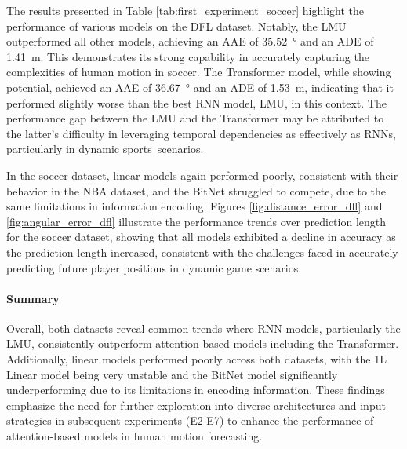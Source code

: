 The results presented in Table \ref{tab:first_experiment_soccer} highlight the performance of various models on the DFL dataset. Notably, the LMU outperformed all other models, achieving an AAE of \SI{35.52}{\degree} and an ADE of \SI{1.41}{\meter}. This demonstrates its strong capability in accurately capturing the complexities of human motion in soccer. The Transformer model, while showing potential, achieved an AAE of \SI{36.67}{\degree} and an ADE of \SI{1.53}{\meter}, indicating that it performed slightly worse than the best RNN model, LMU, in this context. The performance gap between the LMU and the Transformer may be attributed to the latter's difficulty in leveraging temporal dependencies as effectively as RNNs, particularly in dynamic sports~scenarios.

In the soccer dataset, linear models again performed poorly, consistent with their behavior in the NBA dataset, and the BitNet struggled to compete, due to the same limitations in information encoding. Figures \ref{fig:distance_error_dfl} and \ref{fig:angular_error_dfl} illustrate the performance trends over prediction length for the soccer dataset, showing that all models exhibited a decline in accuracy as the prediction length increased, consistent with the challenges faced in accurately predicting future player positions in dynamic game scenarios.

\paragraph{Summary}
Overall, both datasets reveal common trends where RNN models, particularly the LMU, consistently outperform attention-based models including the Transformer. Additionally, linear models performed poorly across both datasets, with the 1L Linear model being very unstable and the BitNet model significantly underperforming due to its limitations in encoding information. These findings emphasize the need for further exploration into diverse architectures and input strategies in subsequent experiments (E2-E7) to enhance the performance of attention-based models in human motion forecasting.
\FloatBarrier


